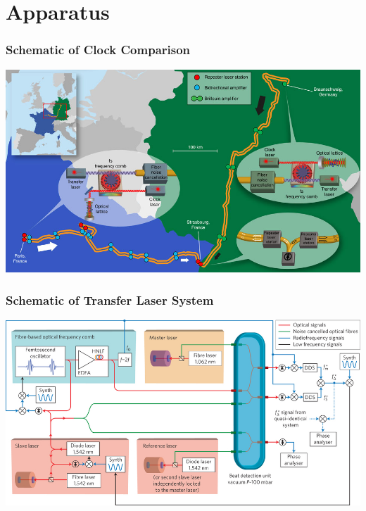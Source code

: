 \documentclass{beamer}
\begin{document}
\section{Apparatus} 

\begin{frame}\frametitle{Schematic of Clock Comparison}
    \includegraphics[width=1.0\textwidth,keepaspectratio]{Images/Link_Map.jpg}

    \cite{Lisdat2016}
\end{frame}

\begin{frame}\frametitle{Schematic of Transfer Laser System}
    \includegraphics[width=1.0\textwidth,keepaspectratio]{Images/Transfer_Schematic.jpg}
    
    \cite{Nicolodi2014}
\end{frame}
\end{document}
